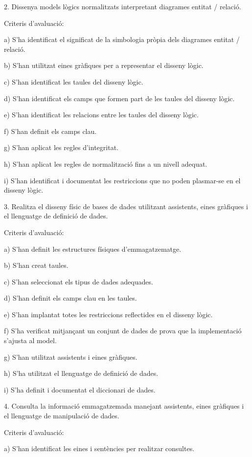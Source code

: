 \documentclass[catalan, a4paper, 12pt, titlepage]{article}
\begin{document}
2. Dissenya models lògics normalitzats interpretant diagrames entitat / relació.

Criteris d'avaluació:

a) S'ha identificat el significat de la simbologia pròpia dels diagrames entitat / relació.

b) S'han utilitzat eines gràfiques per a representar el disseny lògic.

c) S'han identificat les taules del disseny lògic.

d) S'han identificat els camps que formen part de les taules del disseny lògic.

e) S'han identificat les relacions entre les taules del disseny lògic.

f) S'han definit els camps clau.

g) S'han aplicat les regles d'integritat.

h) S'han aplicat les regles de normalització fins a un nivell adequat.

i) S'han identificat i documentat les restriccions que no poden plasmar-se en el disseny lògic.

3. Realitza el disseny físic de bases de dades utilitzant assistents, eines gràfiques i el llenguatge de definició de dades.

Criteris d'avaluació:

a) S'han definit les estructures físiques d'emmagatzematge.

b) S'han creat taules.

c) S'han seleccionat els tipus de dades adequades.

d) S'han definit els camps clau en les taules.

e) S'han implantat totes les restriccions reflectides en el disseny lògic.

f) S'ha verificat mitjançant un conjunt de dades de prova que la implementació s'ajusta al model.

g) S'han utilitzat assistents i eines gràfiques.

h) S'ha utilitzat el llenguatge de definició de dades.

i) S'ha definit i documentat el diccionari de dades.

4. Consulta la informació emmagatzemada manejant assistents, eines gràfiques i el llenguatge de manipulació de dades.

Criteris d'avaluació:

a) S'han identificat les eines i sentències per realitzar consultes.
\end{document}
